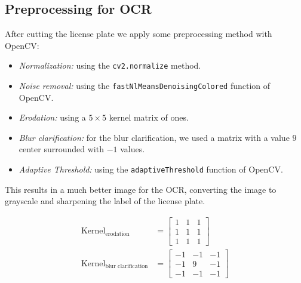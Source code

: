 \subsection{Preprocessing for OCR}

After cutting the license plate we apply some preprocessing method with OpenCV:
\begin{itemize}
    \item \emph{Normalization:} using the \texttt{cv2.normalize} method.
    \item \emph{Noise removal:} using the
        \texttt{fastNlMeansDenoisingColored} function of OpenCV.
    \item \emph{Erodation:} using a $5 \times 5$ kernel matrix of ones.
    \item \emph{Blur clarification:} for the blur clarification, we used a matrix
        with a value $9$ center surrounded with $-1$ values.
    \item \emph{Adaptive Threshold:} using the \texttt{adaptiveThreshold}
        function of OpenCV. 
\end{itemize}

This results in a much better image for the OCR, converting the image to
grayscale and sharpening the label of the license plate. 

\begin{align*}
    \text{Kernel}_{\text{erodation}}&= 
    \begin{bmatrix}
        1 & 1 & 1\\
        1 & 1 & 1 \\
        1 & 1 & 1
    \end{bmatrix}\\
    \text{Kernel}_{\text{blur clarification}}&= 
    \begin{bmatrix}
        -1 & -1 & -1\\
        -1 & 9  & -1 \\
        -1 & -1 & -1
    \end{bmatrix}
\end{align*}

